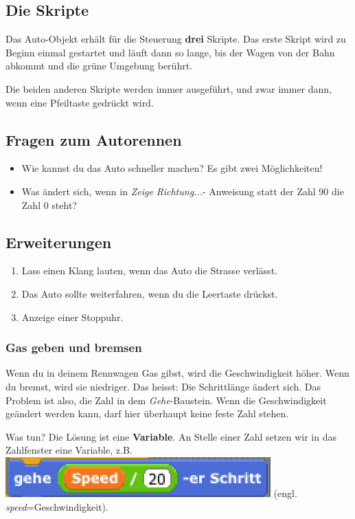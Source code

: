 \documentclass[12pt,a4paper,titlepage]{article}
\begin{document}
\subsection{Die Skripte}
\label{sub:skripte}

Das Auto-Objekt erhält für die Steuerung \textbf{drei} Skripte. Das erste Skript wird zu Beginn einmal gestartet und läuft dann so lange, bis der Wagen von der Bahn abkommt und die grüne Umgebung berührt.

Die beiden anderen Skripte werden immer ausgeführt, und zwar immer dann, wenn eine Pfeiltaste gedrückt wird.

\subsection{Fragen zum Autorennen}

\begin{itemize}
\item Wie kannst du das Auto schneller machen? Es gibt zwei Möglichkeiten!
\item Was ändert sich, wenn in \textit{Zeige Richtung...}- Anweisung statt der Zahl 90 die Zahl 0 steht?
\end{itemize}

\subsection{Erweiterungen}

\begin{enumerate}
\item Lass einen Klang lauten, wenn das Auto die Strasse verlässt.
\item Das Auto sollte weiterfahren, wenn du die Leertaste drückst.
\item Anzeige einer Stoppuhr.
\end{enumerate}

\subsubsection{Gas geben und bremsen}

Wenn du in deinem Rennwagen Gas gibst, wird die Geschwindigkeit höher. Wenn du bremst, wird sie niedriger. Das heisst: Die Schrittlänge ändert sich. Das Problem ist also, die Zahl in dem \textit{Gehe}-Baustein. Wenn die Geschwindigkeit geändert werden kann, darf hier überhaupt keine feste Zahl stehen.

Was tun? Die Lösung ist eine \textbf{Variable}. An Stelle einer Zahl setzen wir in das Zahlfenster eine Variable, z.B. \includegraphics[height=\ht\strutbox]{speed.png} (engl. \textit{speed}=Geschwindigkeit).
\end{document}
